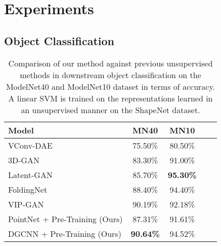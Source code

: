 \documentclass{article}
\begin{document}
\section{Experiments}
\label{experimental setup}

\subsection{Object Classification}

\begin{table}[t]
\vskip -0.15in
\caption{Comparison of our method against previous unsupervised methods in downstream object classification on the ModelNet40 and ModelNet10 dataset in terms of accuracy. A linear SVM is trained on the representations learned in an unsupervised manner on the ShapeNet dataset.}
\label{classification-table}
\begin{center}
\begin{small}
\begin{tabular}{lcccr}
\toprule
Model & MN40 & MN10 \\
\midrule
VConv-DAE \cite{vconvdae}   & 75.50\% & 80.50\%    \\
3D-GAN \cite{3dgan}          & 83.30\% & 91.00\% \\
Latent-GAN \cite{latentgan} & 85.70\% & \textbf{95.30\%} \\
FoldingNet \cite{foldingnet} & 88.40\% & 94.40\% \\
VIP-GAN \cite{vipgan} & 90.19\% & 92.18\% \\
\midrule
PointNet + Pre-Training (Ours) & 87.31\% & 91.61\% \\
DGCNN + Pre-Training (Ours) & \textbf{90.64\%} & 94.52\% \\
\bottomrule
\end{tabular}
\end{small}
\end{center}
\vskip -0.15in
\end{table}
\end{document}
